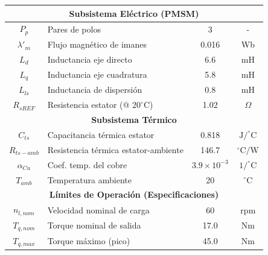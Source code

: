 \documentclass[12pt, a4paper,journal, onecolumn, compsoc]{IEEEtran}
\begin{document}
\begin{table}[htbp]
\begin{tabular}{|c|l|c|c|}
        \hline
        \multicolumn{4}{|c|}{\textbf{Subsistema Eléctrico (PMSM)}} \\
        \hline
        $P_p$ & Pares de polos & 3 & - \\
        $\lambda'_m$ & Flujo magnético de imanes & 0.016 & Wb \\
        $L_d$ & Inductancia eje directo & 6.6 & mH \\
        $L_q$ & Inductancia eje cuadratura & 5.8 & mH \\
        $L_{ls}$ & Inductancia de dispersión & 0.8 & mH \\
        $R_{sREF}$ & Resistencia estator (@ $20^\circ$C) & 1.02 & $\Omega$ \\
        \hline
        \multicolumn{4}{|c|}{\textbf{Subsistema Térmico}} \\
        \hline
        $C_{ts}$ & Capacitancia térmica estator & 0.818 & $\text{J}/^\circ\text{C}$ \\
        $R_{ts-amb}$ & Resistencia térmica estator-ambiente & 146.7 & $^\circ\text{C}/\text{W}$ \\
        $\alpha_{Cu}$ & Coef. temp. del cobre & $3.9 \times 10^{-3}$ & $1/^\circ\text{C}$ \\
        $T_{amb}$ & Temperatura ambiente & 20 & $^\circ\text{C}$ \\
        \hline
        \multicolumn{4}{|c|}{\textbf{Límites de Operación (Especificaciones)}} \\
        \hline
        $n_{l,nom}$ & Velocidad nominal de carga & 60 & rpm \\
        $T_{q,nom}$ & Torque nominal de salida & 17.0 & Nm \\
        $T_{q,max}$ & Torque máximo (pico) & 45.0 & Nm \\
        \hline
    \end{tabular}
    \label{tab:parametros}
\end{table}
\end{document}
